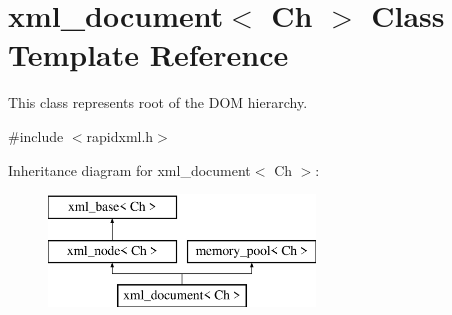 \hypertarget{classrapidxml_1_1xml__document}{}\section{xml\+\_\+document$<$ Ch $>$ Class Template Reference}
\label{classrapidxml_1_1xml__document}


This class represents root of the D\+OM hierarchy.  




{\ttfamily \#include $<$rapidxml.\+h$>$}

Inheritance diagram for xml\+\_\+document$<$ Ch $>$\+:\begin{figure}[H]
\begin{center}
\leavevmode
\includegraphics[height=3.000000cm]{classrapidxml_1_1xml__document}
\end{center}
\end{figure}
